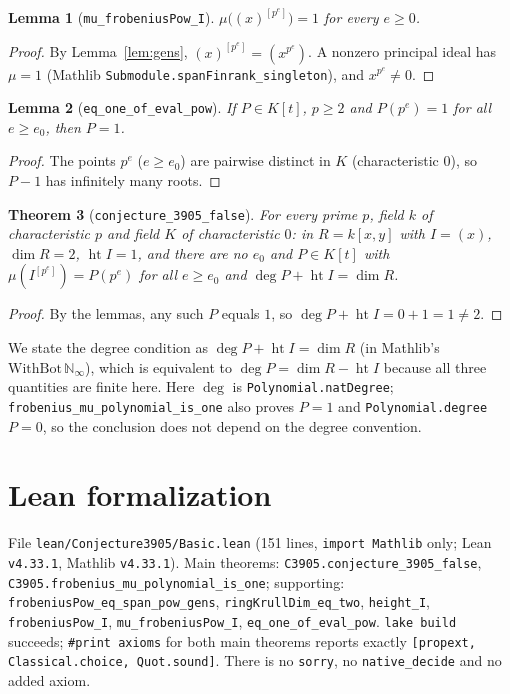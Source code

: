 \documentclass[11pt]{article}
\newtheorem{theorem}{Theorem}
\newtheorem{lemma}[theorem]{Lemma}
\theoremstyle{definition}
\begin{document}
\begin{lemma}[\texttt{mu\_frobeniusPow\_I}]
$\mu\bigl((x)^{[p^e]}\bigr)=1$ for every $e\ge 0$.
\end{lemma}
\begin{proof}
By Lemma~\ref{lem:gens}, $(x)^{[p^e]}=(x^{p^e})$. A nonzero principal ideal has $\mu=1$
(Mathlib \texttt{Submodule.spanFinrank\_singleton}), and $x^{p^e}\ne 0$.
\end{proof}

\begin{lemma}[\texttt{eq\_one\_of\_eval\_pow}]
If $P\in K[t]$, $p\ge 2$ and $P(p^e)=1$ for all $e\ge e_0$, then $P=1$.
\end{lemma}
\begin{proof}
The points $p^e$ ($e\ge e_0$) are pairwise distinct in $K$ (characteristic $0$), so $P-1$ has
infinitely many roots.
\end{proof}

\begin{theorem}[\texttt{conjecture\_3905\_false}]
For every prime $p$, field $k$ of characteristic $p$ and field $K$ of characteristic $0$: in
$R=k[x,y]$ with $I=(x)$, $\dim R=2$, $\operatorname{ht}I=1$, and there are no $e_0$ and $P\in K[t]$ with
$\mu(I^{[p^e]})=P(p^e)$ for all $e\ge e_0$ and $\deg P+\operatorname{ht}I=\dim R$.
\end{theorem}
\begin{proof}
By the lemmas, any such $P$ equals $1$, so $\deg P+\operatorname{ht}I=0+1=1\ne2$.
\end{proof}
We state the degree condition as $\deg P+\operatorname{ht}I=\dim R$ (in Mathlib's
$\mathrm{WithBot}\,\mathbb N_\infty$), which is equivalent to $\deg P=\dim R-\operatorname{ht}I$
because all three quantities are finite here. Here $\deg$ is \texttt{Polynomial.natDegree};
\texttt{frobenius\_mu\_polynomial\_is\_one} also proves $P=1$ and \texttt{Polynomial.degree} $P=0$, so the
conclusion does not depend on the degree convention.

\section{Lean formalization}
File \texttt{lean/Conjecture3905/Basic.lean} (151 lines, \texttt{import Mathlib} only; Lean
\texttt{v4.33.1}, Mathlib \texttt{v4.33.1}). Main theorems: \texttt{C3905.conjecture\_3905\_false},
\texttt{C3905.frobenius\_mu\_polynomial\_is\_one}; supporting:
\texttt{frobeniusPow\_eq\_span\_pow\_gens}, \texttt{ringKrullDim\_eq\_two}, \texttt{height\_I},
\texttt{frobeniusPow\_I}, \texttt{mu\_frobeniusPow\_I}, \texttt{eq\_one\_of\_eval\_pow}.
\texttt{lake build} succeeds; \texttt{\#print axioms} for both main theorems reports exactly
\texttt{[propext, Classical.choice, Quot.sound]}. There is no \texttt{sorry}, no \texttt{native\_decide}
and no added axiom.
\end{document}
